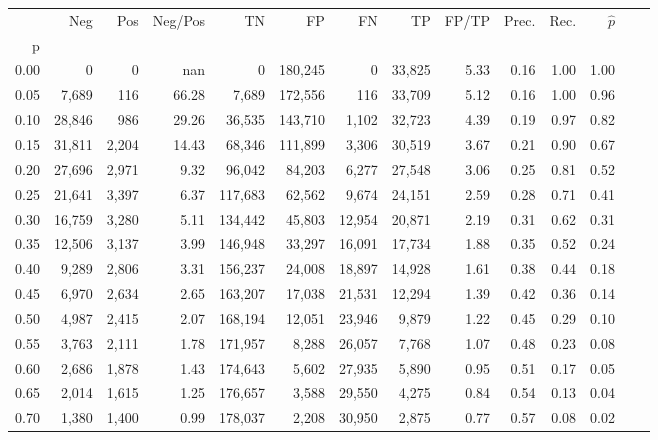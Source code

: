 \begin{tabular}{rrrrrrrrrrrrrr}
\toprule
{} &     Neg &    Pos & Neg/Pos &       TN &       FP &      FN &      TP & FP/TP & Prec. &  Rec. & $\hat{p}$ \\
p    &         &        &         &          &          &         &         &       &       &       &           \\
\midrule
0.00 &       0 &      0 &     nan &        0 &  180,245 &       0 &  33,825 &  5.33 &  0.16 &  1.00 &      1.00 \\
0.05 &   7,689 &    116 &   66.28 &    7,689 &  172,556 &     116 &  33,709 &  5.12 &  0.16 &  1.00 &      0.96 \\
0.10 &  28,846 &    986 &   29.26 &   36,535 &  143,710 &   1,102 &  32,723 &  4.39 &  0.19 &  0.97 &      0.82 \\
0.15 &  31,811 &  2,204 &   14.43 &   68,346 &  111,899 &   3,306 &  30,519 &  3.67 &  0.21 &  0.90 &      0.67 \\
0.20 &  27,696 &  2,971 &    9.32 &   96,042 &   84,203 &   6,277 &  27,548 &  3.06 &  0.25 &  0.81 &      0.52 \\
0.25 &  21,641 &  3,397 &    6.37 &  117,683 &   62,562 &   9,674 &  24,151 &  2.59 &  0.28 &  0.71 &      0.41 \\
0.30 &  16,759 &  3,280 &    5.11 &  134,442 &   45,803 &  12,954 &  20,871 &  2.19 &  0.31 &  0.62 &      0.31 \\
0.35 &  12,506 &  3,137 &    3.99 &  146,948 &   33,297 &  16,091 &  17,734 &  1.88 &  0.35 &  0.52 &      0.24 \\
0.40 &   9,289 &  2,806 &    3.31 &  156,237 &   24,008 &  18,897 &  14,928 &  1.61 &  0.38 &  0.44 &      0.18 \\
0.45 &   6,970 &  2,634 &    2.65 &  163,207 &   17,038 &  21,531 &  12,294 &  1.39 &  0.42 &  0.36 &      0.14 \\
0.50 &   4,987 &  2,415 &    2.07 &  168,194 &   12,051 &  23,946 &   9,879 &  1.22 &  0.45 &  0.29 &      0.10 \\
0.55 &   3,763 &  2,111 &    1.78 &  171,957 &    8,288 &  26,057 &   7,768 &  1.07 &  0.48 &  0.23 &      0.08 \\
0.60 &   2,686 &  1,878 &    1.43 &  174,643 &    5,602 &  27,935 &   5,890 &  0.95 &  0.51 &  0.17 &      0.05 \\
0.65 &   2,014 &  1,615 &    1.25 &  176,657 &    3,588 &  29,550 &   4,275 &  0.84 &  0.54 &  0.13 &      0.04 \\
0.70 &   1,380 &  1,400 &    0.99 &  178,037 &    2,208 &  30,950 &   2,875 &  0.77 &  0.57 &  0.08 &      0.02 \\

\end{tabular}
